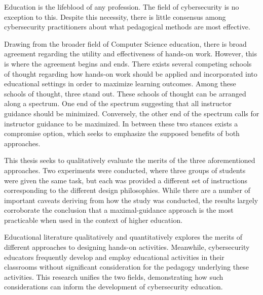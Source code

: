 
\providecommand{\heading}[1]{\section{#1}}
\providecommand{\subheading}[1]{\subsection{#1}}

Education is the lifeblood of any profession. 
The field of cybersecurity is no exception to this. 
Despite this necessity, there is little consensus among cybersecurity practitioners about what pedagogical methods are most effective.

Drawing from the broader field of Computer Science education, there is broad agreement regarding the utility and effectiveness of hands-on work. 
However, this is where the agreement begins and ends. 
There exists several competing schools of thought regarding how hands-on work should be applied and incorporated into educational settings in order to maximize learning outcomes. 
Among these schools of thought, three stand out. 
These schools of thought can be arranged along a spectrum. One end of the spectrum suggesting that all instructor guidance should be minimized. 
Conversely, the other end of the spectrum calls for instructor guidance to be maximized. 
In between these two stances exists a compromise option, which seeks to emphasize the supposed benefits of both approaches.

This thesis seeks to qualitatively evaluate the merits of the three aforementioned approaches. 
Two experiments were conducted, where three groups of students were given the same task, but each was provided a different set of instructions corresponding to the different design philosophies. 
While there are a number of important caveats deriving from how the study was conducted, the results largely corroborate the conclusion that a maximal-guidance approach is the most practicable when used in the context of higher education. 

Educational literature qualitatively and quantitatively explores the merits of different approaches to designing hands-on activities. 
Meanwhile, cybersecurity educators frequently develop and employ educational activities in their classrooms without significant consideration for the pedagogy underlying these activities. 
This research unifies the two fields, demonstrating how such considerations can inform the development of cybersecurity education. 

